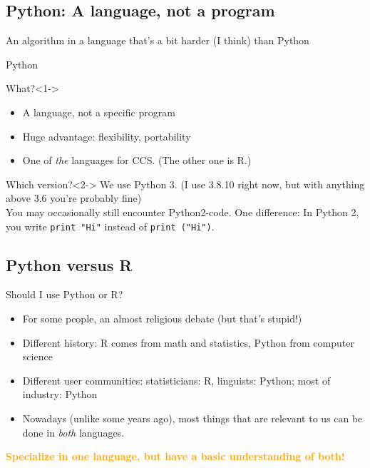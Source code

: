 \subsection{Python: A language, not a program}


\begin{frame}[plain]
	\footnotesize{An algorithm in a language that's a bit harder (I think) than Python}
\end{frame}



\begin{frame}{Python}
	\begin{block}{What?}<1->
		\begin{itemize}
			\item A language, not a specific program
			\item Huge advantage: flexibility, portability
			\item One of \emph{the} languages for CCS. \tiny{(The other one is R.)}
		\end{itemize}
	\end{block}
	
	\begin{block}{Which version?}<2->
		We use Python 3. (I use 3.8.10 right now, but with anything above 3.6 you're probably fine)\\ 
		You may occasionally still encounter Python2-code. One difference: In Python 2, you write {\tt print "Hi"} instead of {\tt print ("Hi")}.\\
	\end{block}
\end{frame}


\subsection{Python versus R}
\begin{frame}{Should I use Python or R?}
	\begin{itemize}
		\item For some people, an almost religious debate (but that's stupid!)
		\item Different history: R comes from math and statistics, Python from computer science
		\item Different user communities: statisticians: R, linguists: Python; most of industry: Python
		\item Nowadays (unlike some years ago), most things that are relevant to us can be done in \emph{both} languages.
	\end{itemize}
\pause
\textcolor{orange}{\textbf{Specialize in one language, but have a basic understanding of both!}}
\end{frame}

